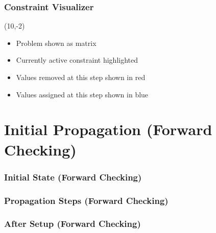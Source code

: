 \documentclass{beamer}
\begin{document}
\begin{frame}
\frametitle{Constraint Visualizer}
\begin{textblock}{5.5}(10,-2)
\scalebox{0.68}{}
\end{textblock}
\begin{itemize}
\item Problem shown as matrix
\item Currently active constraint highlighted
\item Values removed at this step shown in red
\item Values assigned at this step shown in blue
\end{itemize}
\end{frame}

\section{Initial Propagation (Forward Checking)}

\begin{frame}
\frametitle{Initial State (Forward Checking)}

\end{frame}

\begin{frame}
\frametitle{Propagation Steps (Forward Checking)}
\vfill
{}
\end{frame}

\begin{frame}
\frametitle{After Setup (Forward Checking)}

\end{frame}
\end{document}
